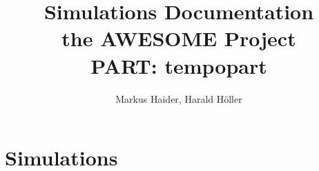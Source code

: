 \documentclass[a4paper,11pt,fleqn,oneside]{book}
\author{Markus Haider, Harald H\"oller}
\begin{document}
\title{\textbf{Simulations Documentation} \\
the AWESOME Project \\
PART: tempopart }
\maketitle
\tableofcontents

\chapter{Simulations} 
\end{document}
